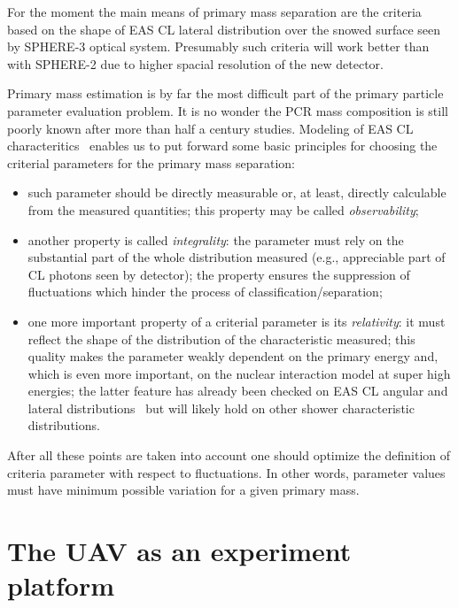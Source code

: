 \documentclass[a4paper,11pt]{article}
\begin{document}
For the moment the main means of primary mass separation are the criteria based on the shape of EAS CL lateral distribution over the snowed surface seen by SPHERE-3 optical system. Presumably such criteria will work better than with SPHERE-2 due to higher spacial resolution of the new detector.

Primary mass estimation is by far the most difficult part of the primary particle parameter evaluation problem. It is no wonder the PCR mass composition is still poorly known after more than half a century studies. Modeling of EAS CL characteritics~\cite{Gal18a,Gal18b,Ant09,Ant09b}
enables us to put forward some basic principles for choosing the criterial parameters for the primary mass separation:

\begin{itemize}
\item such parameter should be directly measurable or, at least, directly calculable from the measured quantities; this property may be called {\it observability};

\item another property is called {\it integrality}: the parameter must rely on the substantial part of the whole distribution measured (e.g., appreciable part of CL photons seen by detector); the property ensures the suppression of fluctuations which hinder the process of classification/separation;

\item one more important property of a criterial parameter is its {\it relativity}: it must reflect the shape of the distribution of the characteristic measured; this quality makes the parameter weakly dependent on the primary energy and, which is even more important, on the nuclear interaction model at super high energies; the latter feature has already been checked on EAS CL angular and lateral distributions~\cite{Gal18a,Gal18b,Ant09,Ant09b} but will likely hold on other shower characteristic distributions.

\end{itemize}
After all these points are taken into account one should optimize the definition of criteria parameter with respect to fluctuations. In other words, parameter values must have minimum possible variation for a given primary mass.


\section{The UAV as an experiment platform}
\end{document}
